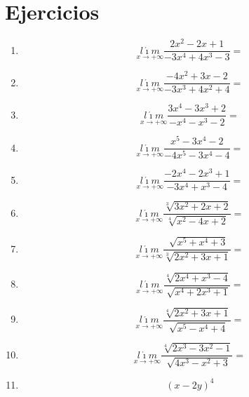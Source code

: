 \documentclass[oneside,spanish,letter]{article}
\begin{document}
\section{Ejercicios}
\begin{enumerate}
 \item $$\underset{x\rightarrow +\infty}{l\acute{\imath}m} \frac{2x^2-2x+1}{-3x^4+4x^3-3}=$$
 \item $$\underset{x\rightarrow +\infty}{l\acute{\imath}m} \frac{-4x^2+3x-2}{-3x^3+4x^2+4}=$$
 \item $$\underset{x\rightarrow +\infty}{l\acute{\imath}m} \frac{3x^4-3x^3+2}{-x^4-x^3-2}=$$
 \item $$\underset{x\rightarrow +\infty}{l\acute{\imath}m} \frac{x^5-3x^4-2}{-4x^5-3x^4-4}=$$
 \item $$\underset{x\rightarrow +\infty}{l\acute{\imath}m} \frac{-2x^4-2x^3+1}{-3x^4+x^3-4}=$$
 \item $$\underset{x\rightarrow +\infty}{l\acute{\imath}m} \frac{\sqrt[3]{3x^2+2x+2}}{\sqrt[4]{x^2-4x+2}}=$$
 \item $$\underset{x\rightarrow +\infty}{l\acute{\imath}m} \frac{\sqrt[]{x^5+x^4+3}}{\sqrt[3]{2x^2+3x+1}}=$$
 \item $$\underset{x\rightarrow +\infty}{l\acute{\imath}m} \frac{\sqrt[4]{2x^4+x^3-4}}{\sqrt[]{x^4+2x^3+1}}=$$
 \item $$\underset{x\rightarrow +\infty}{l\acute{\imath}m} \frac{\sqrt[4]{2x^2+3x+1}}{\sqrt[]{x^5-x^4+4}}=$$
 \item $$\underset{x\rightarrow +\infty}{l\acute{\imath}m} \frac{\sqrt[4]{2x^3-3x^2-1}}{\sqrt[]{4x^3-x^2+3}}=$$
\item $$(x-2y)^4$$
 \end{enumerate}
  \newpage
\end{document}
